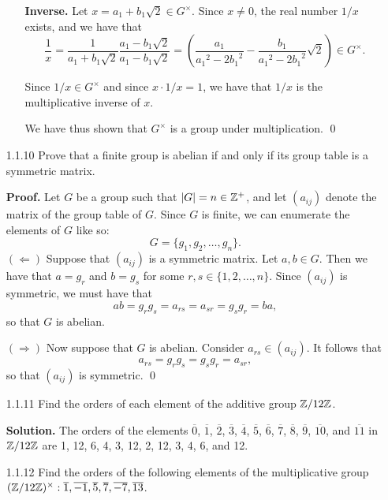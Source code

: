 \begin{enumerate}
\begin{enumerate}
               \textbf{Inverse.} Let $x = a_1 + b_1\sqrt{2} \in G^{\times}$.
               Since $x \neq 0$, the real number $1/x$ exists, and we have that
               $$\frac{1}{x} = \frac{1}{a_1 + b_1\sqrt{2}}
                 \frac{a_1 - b_1\sqrt{2}}{a_1 - b_1\sqrt{2}} =
                 \left(\frac{a_1}{{a_1}^2 - 2{b_1}^2} -
                 \frac{b_1}{{a_1}^2 - 2{b_1}^2}\sqrt{2}\right) \in G^{\times}.
               $$
               
               Since $1/x \in G^{\times}$ and since $x \cdot 1/x = 1$, we have
               that $1/x$ is the multiplicative inverse of $x$.
               
               We have thus shown that $G^{\times}$ is a group under
               multiplication. \qed
      \end{enumerate}
   \item[1.1.10]  Prove that a finite group is abelian if and only if its group
                  table is a symmetric matrix.
                  
      \textbf{Proof.} Let $G$ be a group such that $|G| = n \in \mathbb{Z}^+$, and let
      $(a_{ij})$ denote the matrix of the group table of $G$. Since $G$ is
      finite, we can enumerate the elements of $G$ like so:
      $$G = \{g_1, g_2, \ldots, g_n\}.$$      
      $(\Leftarrow)$ Suppose that $(a_{ij})$ is a symmetric matrix. Let
      $a, b \in G$. Then we have that $a = g_r$ and $b = g_s$ for some
      $r, s \in \{1, 2, \ldots, n\}$. Since $(a_{ij})$ is symmetric, we must
      have that
      $$ab = g_rg_s = a_{rs} = a_{sr} = g_sg_r = ba,$$
      so that $G$ is abelian.
      
      $(\Rightarrow)$ Now suppose that $G$ is abelian. Consider
      $a_{rs} \in (a_{ij})$. It follows that
      $$a_{rs} = g_rg_s = g_sg_r = a_{sr},$$
      so that $(a_{ij})$ is symmetric. \qed
   \item[1.1.11]  Find the orders of each element of the additive group
                  $\mathbb{Z}/12\mathbb{Z}$.
                  
      \textbf{Solution.} The orders of the elements $\overline{0}$,
      $\overline{1}$, $\overline{2}$, $\overline{3}$, $\overline{4}$,
      $\overline{5}$, $\overline{6}$, $\overline{7}$, $\overline{8}$,
      $\overline{9}$, $\overline{10}$, and $\overline{11}$ in $\mathbb{Z}/12\mathbb{Z}$ are
      1, 12, 6, 4, 3, 12, 2, 12, 3, 4, 6, and 12.
   \item[1.1.12]  Find the orders of the following elements of the
                  multiplicative group $(\mathbb{Z}/12\mathbb{Z})^\times: \overline{1},
                  \overline{-1}, \overline{5}, \overline{7}, \overline{-7}, 
                  \overline{13}$.
                  

\end{enumerate}
